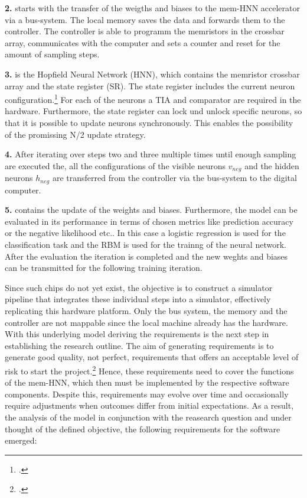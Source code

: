 \textbf{2.} starts with the transfer of the weigths and biases to the \ac{mem-HNN} accelerator via a bus-system. 
The local memory saves the data and forwards them to the controller. 
The controller is able to programm the memristors in the crossbar array, communicates with the computer and sets a counter and reset for the amount of sampling steps. 

\textbf{3.} is the Hopfield Neural Network (HNN), which contains the memristor crossbar array and the state register (SR).
The state register includes the current neuron configuration.\footcite[cf.][18]{caiHarnessingIntrinsicNoise2019}
For each of the neurons a \ac{TIA} and comparator are required in the hardware.
Furthermore, the state register can lock und unlock specific neurons, so that it is possible to update neurons synchronously.
This enables the possibility of the promissing N/2 update strategy.

\textbf{4.} After iterating over steps two and three multiple times until enough sampling are executed the, all the configurations
of the visible neurons \(v_{neg}\) and the  hidden neurons \(h_{neg}\) are transferred from the controller via the bus-system to
the digital computer. 

\textbf{5.} contains the update of the weights and biases. 
Furthermore, the model can be evaluated in its performance in terms of chosen metrics like prediction accuracy or the negative likelihood etc..
In this case a logistic regression is used for the classification task and the \ac{RBM} is used for the trainng of the neural network. 
After the evaluation the iteration is completed and the new weghts and biases can be transmitted for the following training iteration.

Since such chips do not yet exist, the objective is to construct a simulator pipeline that integrates these individual steps into a simulator, effectively replicating this hardware platform.
Only the bus system, the memory and the controller are not mappable since the local machine already has the hardware.
With this underlying model deriving the requirements is the next step in establishing the research outline.
The aim of generating requirements is to generate good quality, not perfect, requirements that offers an acceptable level of risk to start the project.\footcite[cf.][11]{ebertSystematischesRequirementsEngineering2008}
Hence, these requirements need to cover the functions of the \ac{mem-HNN}, which then must be implemented by the respective software components.
Despite this, requirements may evolve over time and occasionally require adjustments when outcomes differ from initial expectations.
As a result, the analysis of the model in conjunction with the reasearch question and under thought of the defined objective, the following requirements for the software emerged:

